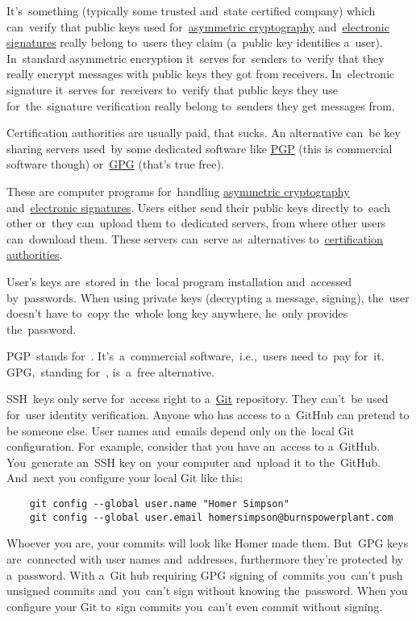 \label{certificationauthority}
It's~something (typically some trusted and~state certified company) which can~verify that public keys used for~\hyperref[asymmetriccryptography]{asymmetric cryptography} and~\hyperref[electronicsignature]{electronic signatures} really belong to~users they claim (a~public key identifies a~user).
In~standard asymmetric encryption it~serves for~senders to~verify that they really encrypt messages with public keys they got from receivers.
In~electronic signature it~serves for~receivers to~verify that public keys they use for~the~signature verification really belong to~senders they get messages from.

Certification authorities are usually paid, that sucks.
An alternative can~be key sharing servers used~by some dedicated software like \hyperref[pgpgpg]{PGP} (this is commercial software though) or~\hyperref[pgpgpg]{GPG} (that's true free).

\label{pgpgpg}
These are computer programs for~handling \hyperref[asymmetriccryptography]{asymmetric cryptography} and~\hyperref[electronicsignature]{electronic signatures}.
Users either send their public keys directly to~each other or~they can~upload them to~dedicated servers, from where other users can~download them.
These servers can~serve as~alternatives to~\hyperref[certificationauthority]{certification authorities}.

User's keys are~stored in~the~local program installation and~accessed by~passwords.
When using private keys (decrypting a message, signing), the~user doesn't have to~copy the~whole long key anywhere, he~only provides the~password.

PGP~stands for~.
It's~a~commercial software,~i.e.,~users need to~pay for~it.
GPG,~standing for~, is~a~free alternative.
\newpage

\label{gitgpg}
SSH~keys only serve for~access right to a~\hyperref[git]{Git} repository.
They can't~be used for~user identity verification.
Anyone who has access to a~GitHub can pretend to be someone else.
User names and~emails depend only on the~local Git configuration.
For~example, consider that you have an~access to a~GitHub.
You~generate an~SSH key on~your computer and~upload it to the~GitHub.
And~next you configure your local Git like this:
\begin{lstlisting}
    git config --global user.name "Homer Simpson"
    git config --global user.email homersimpson@burnspowerplant.com
\end{lstlisting}
\noindent Whoever you are, your commits will look like Homer made them.
But~GPG keys are~connected with user names and~addresses, furthermore they're protected by a~password.
With a~Git hub requiring GPG signing of~commits you~can't push unsigned commits and~you~can't sign without knowing the~password.
When you configure your Git to~sign commits you~can't even commit without signing.

